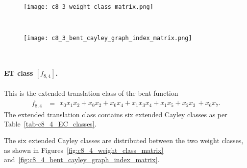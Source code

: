 \documentclass[12pt,a4paper]{article}
\begin{document}
\begin{figure}[!bhpt] %
\centering
\begin{minipage}{.48\textwidth}
  \centering
  \texttt{[image: c8\_3\_weight\_class\_matrix.png]}
  \label{fig:c8_3_weight_class_matrix}
\end{minipage}%
~~~~
\begin{minipage}{.48\textwidth}
  \centering
  \texttt{[image: c8\_3\_bent\_cayley\_graph\_index\_matrix.png]}
  \label{fig:c8_3_bent_cayley_graph_index_matrix}
\end{minipage}
\end{figure}
~
%
\paragraph*{ET class $[f_{8,4}]$.}
This is the extended translation class of the bent function
\small{}
\begin{align*}
f_{ 8 , 4 } &=
\begin{array}{l}
x_{0} x_{1} x_{2} + x_{0} x_{2} + x_{0} x_{4} + x_{1} x_{3} x_{4} + x_{1} x_{5} + x_{2} x_{3}\, +
x_{6} x_{7}.
\end{array}
\end{align*}
\normalsize{}
The extended translation class contains six extended Cayley classes as per Table~\ref{tab-c8_4_EC_classes}.

The six extended Cayley classes are distributed between the two weight classes,
as shown in Figures~\ref{fig:c8_4_weight_class_matrix} and~\ref{fig:c8_4_bent_cayley_graph_index_matrix}.
\end{document}
